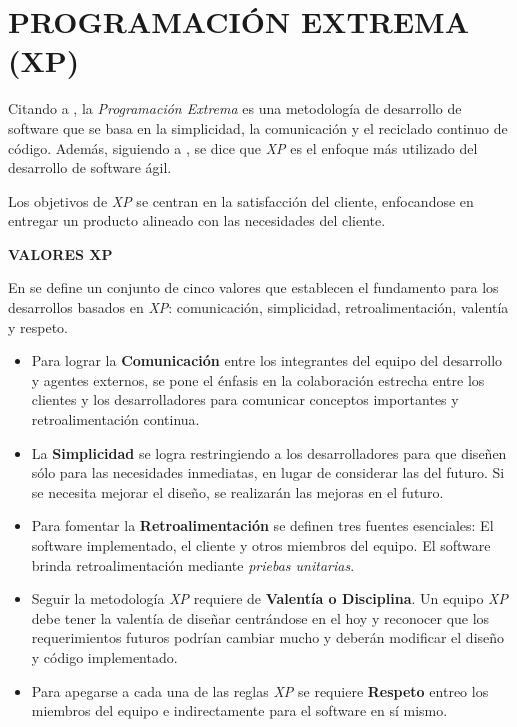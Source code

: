 \section{PROGRAMACIÓN EXTREMA (XP)}

Citando a \parencite{solis2003XP}, la \textit{Programación Extrema} es una metodología de desarrollo de software que se basa en la simplicidad, la comunicación y el reciclado continuo de código. Además, siguiendo a \parencite{pressman2010ingenieria}, se dice que \textit{XP} es el enfoque más utilizado del desarrollo de software ágil.

Los objetivos de \textit{XP} se centran en la satisfacción del cliente, enfocandose en entregar un producto alineado con las necesidades del cliente.

\textbf{VALORES XP}

En \parencite{pressman2010ingenieria} se define un conjunto de cinco valores que establecen el fundamento para los desarrollos basados en \textit{XP}: comunicación, simplicidad, retroalimentación, valentía y respeto.

\begin{itemize}
    \item Para lograr la \textbf{Comunicación} entre los integrantes del equipo del desarrollo y agentes externos, se pone el énfasis en la colaboración estrecha entre los clientes y los desarrolladores para comunicar conceptos importantes y retroalimentación continua.
    \item La \textbf{Simplicidad} se logra restringiendo a los desarrolladores para que diseñen sólo para las necesidades inmediatas, en lugar de considerar las del futuro. Si se necesita mejorar el diseño, se realizarán las mejoras en el futuro.
    \item Para fomentar la \textbf{Retroalimentación} se definen tres fuentes esenciales: El software implementado, el cliente y otros miembros del equipo. El software brinda retroalimentación mediante \textit{priebas unitarias}.
    \item Seguir la metodología \textit{XP} requiere de \textbf{Valentía o Disciplina}. Un equipo \textit{XP} debe tener la valentía de diseñar centrándose en el hoy y reconocer que los requerimientos futuros podrían cambiar mucho y deberán modificar el diseño y código implementado.
    \item Para apegarse a cada una de las reglas \textit{XP} se requiere \textbf{Respeto} entreo los miembros del equipo e indirectamente para el software en sí mismo.
\end{itemize}

